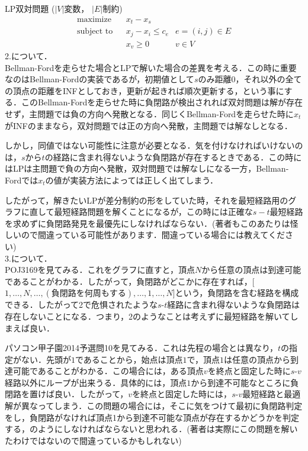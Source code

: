 \documentclass[13pt, a4paper, landscape]{jarticle}
\theoremstyle{nonitalic} %
\begin{document}
LP双対問題
($|V|$変数， $|E|$制約)
\begin{align}
 &&&&&\textrm{maximize}   && x_t - x_s \\
 &&&&&\textrm{subject to} && x_j - x_i\leq c_e & e = (i,j) \in E  &&&&&\\
 &&&&&                    && x_v \geq 0 & v \in V &&&&&
\end{align}
2.について．\\
 Bellman-Fordを走らせた場合とLPで解いた場合の差異を考える．この時に重要なのはBellman-Fordの実装であるが，初期値として$s$のみ距離$0$，それ以外の全ての頂点の距離をINFとしておき，更新が起きれば順次更新する，という事にする．このBellman-Fordを走らせた時に負閉路が検出されれば双対問題は解が存在せず，主問題では負の方向へ発散となる．同じくBellman-Fordを走らせた時に$x_t$がINFのままなら，双対問題では正の方向へ発散，主問題では解なしとなる．

しかし，同値ではない可能性に注意が必要となる．気を付けなければいけないのは，$s$から$t$の経路に含まれ得ないような負閉路が存在するときである．この時にはLPは主問題で負の方向へ発散，双対問題では解なしになる一方，Bellman-Fordでは$x_t$の値が実装方法によっては正しく出てしまう．

したがって，解きたいLPが差分制約の形をしていた時，それを最短経路用のグラフに直して最短経路問題を解くことになるが，この時には正確な$s-t$最短経路を求めずに負閉路発見を最優先にしなければならない．(著者もこのあたりは怪しいので間違っている可能性があります．間違っている場合には教えてください)\\

3.について．\\
POJ3169を見てみる．これをグラフに直すと，頂点$N$から任意の頂点は到達可能であることがわかる．したがって，負閉路がどこかに存在すれば，[$1, \dots ,N,\dots, ( \textrm{負閉路を何周もする} ),\dots ,1, \dots, N$]という，負閉路を含む経路を構成できる．したがって2で危惧されたような$s$-$t$経路に含まれ得ないような負閉路は存在しないことになる．つまり，2のようなことは考えずに最短経路を解いてしまえば良い．

パソコン甲子園2014予選問10を見てみる．これは先程の場合とは異なり，$t$の指定がない．先頭が$1$であることから，始点は頂点$1$で，頂点$1$は任意の頂点から到達可能であることがわかる．この場合には，ある頂点$v$を終点と固定した時に$s$-$v$経路以外にループが出来うる．具体的には，頂点$1$から到達不可能なところに負閉路を置けば良い．したがって，$v$を終点と固定した時には，$s$-$v$最短経路と最適解が異なってしまう．この問題の場合には，そこに気をつけて最初に負閉路判定をし，負閉路がなければ頂点1から到達不可能な頂点が存在するかどうかを判定する，のようにしなければならないと思われる．(著者は実際にこの問題を解いたわけではないので間違っているかもしれない)
\end{document}
